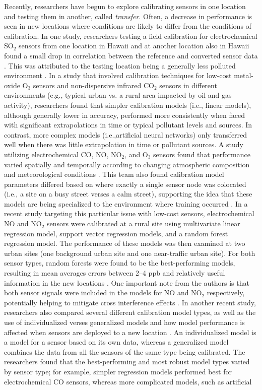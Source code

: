 \documentclass[journal abbreviation, manuscript]{copernicus}
\newcommand{\textus}[1]{$_{\text{#1}}$}
\begin{document}
Recently, researchers have begun to explore calibrating sensors in one location and testing them in another, called \textit{transfer}.  Often, a decrease in performance is seen in new locations where conditions are likely to differ from the conditions of calibration.  In one study, researchers testing a field calibration for electrochemical SO\textus{2} sensors from one location in Hawaii and at another location also in Hawaii found a small drop in correlation between the reference and converted sensor data \citep{Hagan2018}. This was attributed to the testing location being a generally less polluted environment \citep{Hagan2018}.  In a study that involved calibration techniques for low-cost metal-oxide O\textus{3} sensors and non-dispersive infrared CO\textus{2} sensors in different environments (e.g., typical urban vs. a rural area impacted by oil and gas activity), researchers found that simpler calibration models (i.e., linear models), although generally lower in accuracy, performed more consistently when faced with significant extrapolations in time or typical pollutant levels and sources\citep{Casey2018testing}. In contrast, more complex models (i.e.,artificial neural networks) only transferred well when there was little extrapolation in time or pollutant sources.  A study utilizing electrochemical CO, NO, NO\textus{2}, and O\textus{3} sensors found that performance varied spatially and temporally according to changing atmospheric composition and meteorological conditions \citep{Castell2017}. This team also found calibration model parameters differed based on where exactly a single sensor node was colocated (i.e., a site on a busy street verses a calm street), supporting the idea that these models are being specialized to the environment where training occurred \citep{Castell2017}.  In a recent study targeting this particular issue with low-cost sensors, electrochemical NO and NO\textus{2} sensors were calibrated at a rural site using multivariate linear regression model, support vector regression models, and a random forest regression model. The performance of these models was then examined at two urban sites (one background urban site and one near-traffic urban site). For both sensor types, random forests were found to be the best-performing models, resulting in mean averages errors between 2–4 ppb and relatively useful information in the new locations \citep{Bigi2018performance}. One important note from the authors is that both sensor signals were included in the models for NO and NO\textus{2} respectively, potentially helping to mitigate cross interference effects \citep{Bigi2018performance}. In another recent study, researchers also compared several different calibration model types, as well as the use of individualized verses generalized models and how model performance is affected when sensors are deployed to a new location \citep{Malings2018Development}.  An individualized model is a model for a sensor based on its own data, whereas a generalized model combines the data from all the sensors of the same type being calibrated. The researchers found that the best-performing and most robust model types varied by sensor type; for example, simpler regression models performed best for electrochemical CO sensors, whereas more complicated models, such as artificial 
\end{document}
